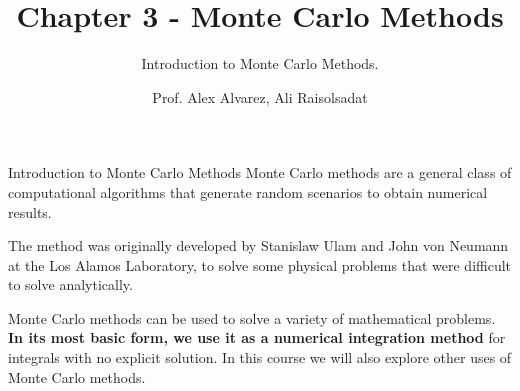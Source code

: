 \documentclass[8pt]{beamer}
\title{Chapter 3 - Monte Carlo Methods}
\subtitle{Introduction to Monte Carlo Methods.}
\author{Prof. Alex Alvarez, Ali Raisolsadat}
\institute{School of Mathematical and Computational Sciences \\ University of Prince Edward Island}
\date{} %
\begin{document}
\maketitle

\begin{frame}{Introduction to Monte Carlo Methods}
Monte Carlo methods are a general class of computational algorithms that generate random scenarios to obtain  numerical results.

\vspace{3mm}

The method was originally developed by Stanislaw Ulam and John von Neumann at the Los Alamos Laboratory, to solve some physical problems that were difficult to solve analytically.

\vspace{3mm}

Monte Carlo methods can be used to solve a variety of mathematical problems. {\bf In its most basic form, we use it as a numerical integration method} for integrals with no explicit solution. In this course we will also explore other uses of Monte Carlo methods.
\end{frame}







\end{document}
